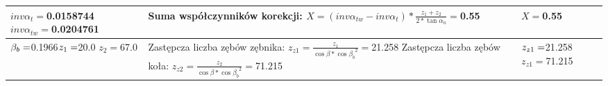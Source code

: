 \documentclass{article}%
\begin{document}
\begin{longtable}{|p{3cm}|p{7cm}|p{3cm}|}
\hline%
 \newline \newline  $inv\alpha_t = $0.0158744 \newline  \newline $inv\alpha_{tw} = $0.0204761&  \newline \newline Suma współczynników korekcji: \newline $X = (inv\alpha_{tw} - inv\alpha_t) * \frac{z_1 + z_2}{2 * \tan{\alpha_n}} = $0.55&$X = $0.55\\%
\hline%
$ \newline  \newline \beta_b = $0.1966$ \newline \newline \newline  z_ 1 = $20.0 \newline  \newline $z_2 = $67.0&Zastępcza liczba zębów zębnika: \newline$z_{z1} = \frac{z_1}{\cos{\beta} * \cos{\beta_b}^2} = $21.258  \newline \newline Zastępcza liczba zębów koła: \newline$z_{z2} = \frac{z_2}{\cos{\beta} * \cos{\beta_b}^2} = $71.215&$ \newline z_{z1} = $21.258 \newline $z_{z1} = $71.215\\%
\hline%

\end{longtable}
\end{document}
